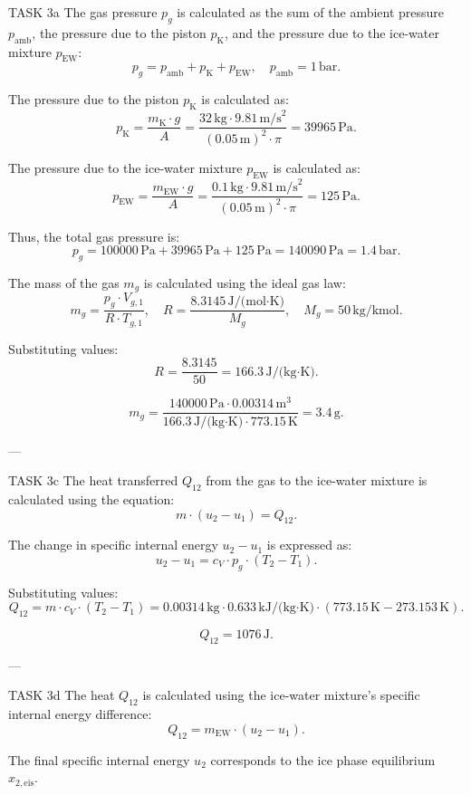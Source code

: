 TASK 3a  
The gas pressure \( p_{g} \) is calculated as the sum of the ambient pressure \( p_{\text{amb}} \), the pressure due to the piston \( p_{\text{K}} \), and the pressure due to the ice-water mixture \( p_{\text{EW}} \):  
\[
p_{g} = p_{\text{amb}} + p_{\text{K}} + p_{\text{EW}}, \quad p_{\text{amb}} = 1 \, \text{bar}.
\]  

The pressure due to the piston \( p_{\text{K}} \) is calculated as:  
\[
p_{\text{K}} = \frac{m_{\text{K}} \cdot g}{A} = \frac{32 \, \text{kg} \cdot 9.81 \, \text{m/s}^2}{(0.05 \, \text{m})^2 \cdot \pi} = 39965 \, \text{Pa}.
\]  

The pressure due to the ice-water mixture \( p_{\text{EW}} \) is calculated as:  
\[
p_{\text{EW}} = \frac{m_{\text{EW}} \cdot g}{A} = \frac{0.1 \, \text{kg} \cdot 9.81 \, \text{m/s}^2}{(0.05 \, \text{m})^2 \cdot \pi} = 125 \, \text{Pa}.
\]  

Thus, the total gas pressure is:  
\[
p_{g} = 100000 \, \text{Pa} + 39965 \, \text{Pa} + 125 \, \text{Pa} = 140090 \, \text{Pa} = 1.4 \, \text{bar}.
\]  

The mass of the gas \( m_{g} \) is calculated using the ideal gas law:  
\[
m_{g} = \frac{p_{g} \cdot V_{g,1}}{R \cdot T_{g,1}}, \quad R = \frac{8.3145 \, \text{J/(mol·K)}}{M_{g}}, \quad M_{g} = 50 \, \text{kg/kmol}.
\]  

Substituting values:  
\[
R = \frac{8.3145}{50} = 166.3 \, \text{J/(kg·K)}.
\]  

\[
m_{g} = \frac{140000 \, \text{Pa} \cdot 0.00314 \, \text{m}^3}{166.3 \, \text{J/(kg·K)} \cdot 773.15 \, \text{K}} = 3.4 \, \text{g}.
\]  

---

TASK 3c  
The heat transferred \( Q_{12} \) from the gas to the ice-water mixture is calculated using the equation:  
\[
m \cdot (u_2 - u_1) = Q_{12}.
\]  

The change in specific internal energy \( u_2 - u_1 \) is expressed as:  
\[
u_2 - u_1 = c_V \cdot p_{g} \cdot (T_2 - T_1).
\]  

Substituting values:  
\[
Q_{12} = m \cdot c_V \cdot (T_2 - T_1) = 0.00314 \, \text{kg} \cdot 0.633 \, \text{kJ/(kg·K)} \cdot (773.15 \, \text{K} - 273.153 \, \text{K}).
\]  

\[
Q_{12} = 1076 \, \text{J}.
\]  

---

TASK 3d  
The heat \( Q_{12} \) is calculated using the ice-water mixture's specific internal energy difference:  
\[
Q_{12} = m_{\text{EW}} \cdot (u_2 - u_1).
\]  

The final specific internal energy \( u_2 \) corresponds to the ice phase equilibrium \( x_{2,\text{eis}} \).